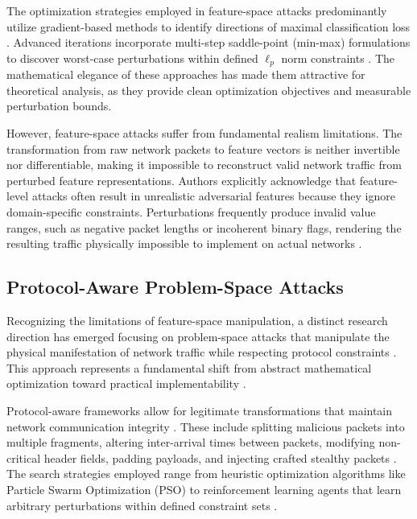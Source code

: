 The optimization strategies employed in feature-space attacks predominantly utilize gradient-based methods to identify directions of maximal classification loss \cite{investigating2023resistance}. Advanced iterations incorporate multi-step saddle-point (min-max) formulations to discover worst-case perturbations within defined $\ell_p$ norm constraints \cite{investigating2023resistance, evaluation2023adversarial}. The mathematical elegance of these approaches has made them attractive for theoretical analysis, as they provide clean optimization objectives and measurable perturbation bounds\cite{simple2023framework, investigating2023practicality}.

However, feature-space attacks suffer from fundamental realism limitations. The transformation from raw network packets to feature vectors is neither invertible nor differentiable, making it impossible to reconstruct valid network traffic from perturbed feature representations. Authors explicitly acknowledge that feature-level attacks often result in unrealistic adversarial features because they ignore domain-specific constraints. Perturbations frequently produce invalid value ranges, such as negative packet lengths or incoherent binary flags, rendering the resulting traffic physically impossible to implement on actual networks \cite{investigating2023practicality}.

\subsection{Protocol-Aware Problem-Space Attacks}

Recognizing the limitations of feature-space manipulation, a distinct research direction has emerged focusing on problem-space attacks that manipulate the physical manifestation of network traffic while respecting protocol constraints \cite{adversarial2023ensemble, enhancing2023robustness}. This approach represents a fundamental shift from abstract mathematical optimization toward practical implementability \cite{he2023adversarial, vitorino2023sok}.

Protocol-aware frameworks allow for legitimate transformations that maintain network communication integrity \cite{enhancing2023robustness}. These include splitting malicious packets into multiple fragments, altering inter-arrival times between packets, modifying non-critical header fields, padding payloads, and injecting crafted stealthy packets \cite{evaluating2023improving, progen2023projection}. The search strategies employed range from heuristic optimization algorithms like Particle Swarm Optimization (PSO) to reinforcement learning agents that learn arbitrary perturbations within defined constraint sets \cite{evaluating2023improving, fixed2023points}.

